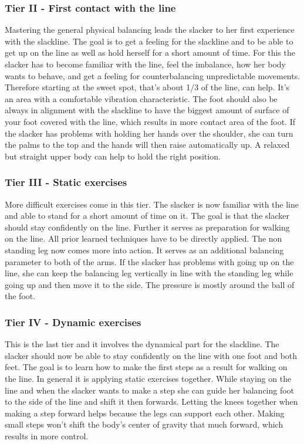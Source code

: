 \subsubsection{Tier II - First contact with the line}
Mastering the general physical balancing leads the slacker to her first experience with the slackline. The goal is to get a feeling for the slackline and to be able to get up on the line as well as hold herself for a short amount of time. For this the slacker has to become familiar with the line, feel the imbalance, how her body wants to behave, and get a feeling for counterbalancing unpredictable movements. Therefore starting at the sweet spot, that's about 1/3 of the line, can help. It's an area with a comfortable vibration characteristic. The foot should also be always in alignment with the slackline to have the biggest amount of surface of your foot covered with the line, which results in more contact area of the foot. If the slacker has problems with holding her hands over the shoulder, she can turn the palms to the top and the hands will then raise automatically up. A relaxed but straight upper body can help to hold the right position.

\subsubsection{Tier III - Static exercises}
More difficult exercises come in this tier. The slacker is now familiar with the line and able to stand for a short amount of time on it. The goal is that the slacker should stay confidently on the line. Further it serves as preparation for walking on the line. All prior learned techniques have to be directly applied. The non standing leg now comes more into action. It serves as an additional balancing parameter to both of the arms. If the slacker has problems with going up on the line, she can keep the balancing leg vertically in line with the standing leg while going up and then move it to the side. The pressure is mostly around the ball of the foot.

\subsubsection{Tier IV - Dynamic exercises}
This is the last tier and it involves the dynamical part for the slackline. The slacker should now be able to stay confidently on the line with one foot and both feet. The goal is to learn how to make the first steps as a result for walking on the line. In general it is applying static exercises together. While staying on the line and when the slacker wants to make a step she can guide her balancing foot to the side of the line and shift it then forwards. Letting the knees together when making a step forward helps because the legs can support each other. Making small steps won't shift the body's center of gravity that much forward, which results in more control.
